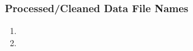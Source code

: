 
\subsubsection*{Processed/Cleaned Data File Names}

\begin{enumerate}[nolistsep]
\item
\item
\end{enumerate}

